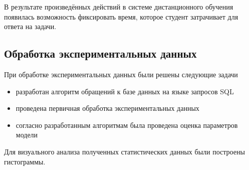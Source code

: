 В результате произведённых действий в системе дистанционного обучения появилась возможность фиксировать время, которое студент затрачивает для ответа на задачи.

\subsection{Обработка экспериментальных данных}

При обработке экспериментальных данных были решены следующие задачи

\begin{itemize}
\item разработан алгоритм обращений к базе данных на языке запросов SQL
\item проведена первичная обработка экспериментальных данных
\item согласно разработанным алгоритмам была проведена оценка параметров модели
\end{itemize}

Для визуального анализа полученных статистических данных были пос\-троены гисто\-граммы.